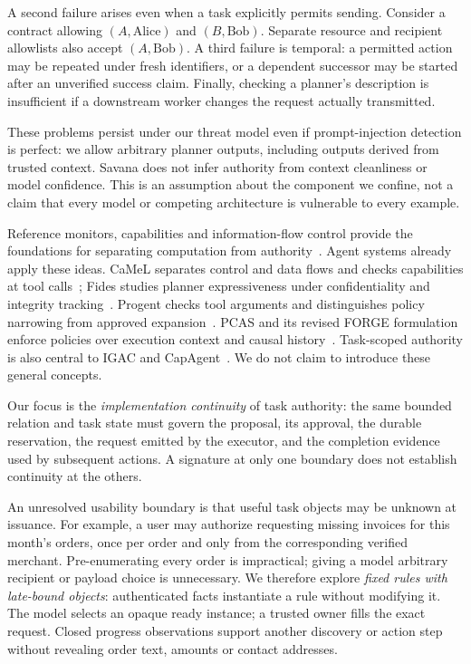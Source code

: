 \documentclass[letterpaper,twocolumn,10pt]{article}
\newcommand{\sys}{Savana}
\begin{document}
A second failure arises even when a task explicitly permits sending. Consider
a contract allowing $(A,\mathrm{Alice})$ and $(B,\mathrm{Bob})$.
Separate resource and recipient allowlists also accept $(A,\mathrm{Bob})$.
A third failure is temporal: a permitted action may be repeated under fresh
identifiers, or a dependent successor may be started after an unverified
success claim. Finally, checking a planner's description is insufficient if
a downstream worker changes the request actually transmitted.

These problems persist under our threat model even if prompt-injection
detection is perfect: we allow arbitrary planner outputs, including outputs
derived from trusted context. \sys{} does not infer authority from context
cleanliness or model confidence. This is an assumption about the component
we confine, not a claim that every model or competing architecture is vulnerable
to every example.

Reference monitors, capabilities and information-flow control provide the
foundations for separating computation from authority~\cite{saltzer1975,
dennis1966,denning1976,myers1997}. Agent systems already apply these ideas.
CaMeL separates control and data flows and checks capabilities at tool
calls~\cite{debenedetti2025camel}; Fides studies planner expressiveness under
confidentiality and integrity tracking~\cite{costa2025fides}.
Progent checks tool arguments and distinguishes policy narrowing from approved
expansion~\cite{shi2025progent}. PCAS and its revised FORGE formulation enforce
policies over execution context and causal history~\cite{palumbo2026pcas,
palumbo2026forge}. Task-scoped authority is also central to IGAC and
CapAgent~\cite{zhu2026igac,hou2026capagent}. We do not claim to introduce these
general concepts.

Our focus is the \emph{implementation continuity} of task authority: the same
bounded relation and task state must govern the proposal, its approval,
the durable reservation, the request emitted by the executor, and the
completion evidence used by subsequent actions. A signature at only one
boundary does not establish continuity at the others.

An unresolved usability boundary is that useful task objects may be unknown at
issuance. For example, a user may authorize requesting missing invoices for this
month's orders, once per order and only from the corresponding verified merchant.
Pre-enumerating every order is impractical; giving a model arbitrary recipient
or payload choice is unnecessary. We therefore explore \emph{fixed rules with
late-bound objects}: authenticated facts instantiate a rule without modifying
it. The model selects an opaque ready instance; a trusted owner fills the exact
request. Closed progress observations support another discovery or action step
without revealing order text, amounts or contact addresses.
\end{document}
